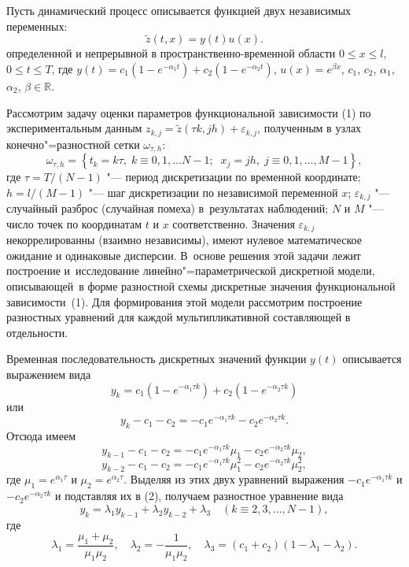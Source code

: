 Пусть динамический процесс описывается функцией двух независимых переменных:
\begin{equation}
\tilde z(t, x)=y(t)u(x).
\end{equation}
определенной и непрерывной в пространственно-временной области $0\leq{x}\leq{l}$, $0\leq{t}\leq{T}$, где $y(t)=c_1(1-e^{-\alpha_1t})+c_2(1-e^{-\alpha_2t})$, $u(x)=e^{\beta{x}}$, $c_1$, $c_2$, $\alpha_1$, $\alpha_2$, $\beta\in \mathbb{R}$.

Рассмотрим задачу оценки параметров функциональной зависимости (1) по экспериментальным данным $z_{k,j}=\tilde{z}({\tau}k, jh)+\varepsilon_{k,j}$, полученным в узлах конечно"=разностной сетки $\omega_{\tau,h}$:
$$\omega_{\tau,h}=\left\{t_k=k\tau,\; k\equiv 0, 1, \ldots N-1; \;\; x_j=jh, \; j\equiv 0, 1, \ldots, M-1\right\},
$$
где $\tau={T}/(N-1)$ "--- период дискретизации по временной координате; 
$h={l}/({M-1})$ "--- шаг дискретизации по независимой переменной $x$; 
$\varepsilon_{k,j}$ "--- случайный разброс (случайная помеха) в~результатах наблюдений; 
$N$ и $M$ "--- число точек по координатам $t$ и $x$ соответственно. 
Значения $\varepsilon_{k,j}$ некоррелированны (взаимно независимы), имеют нулевое математическое ожидание и одинаковые дисперсии. 
В~основе решения этой задачи лежит построение и~исследование линейно"=параметрической дискретной модели, описывающей~в форме разностной схемы дискретные значения функциональной зависимости~(1). 
Для формирования этой модели рассмотрим построение разностных уравнений для каждой мультипликативной составляющей в отдельности.

Временная последовательность дискретных значений функции $y(t)$ описывается выражением вида 
$$y_k=c_1(1-e^{-{\alpha_1}{\tau}k})+c_2(1-e^{-{\alpha_2}{\tau}k})$$ или
\begin{equation}
y_k-c_1-c_2=-c_1e^{-{\alpha_1}{\tau}k}-c_2e^{-{\alpha_2}{\tau}k}.
\end{equation}
Отсюда имеем $$y_{k-1}-c_1-c_2=-c_1e^{-\alpha_1\tau{k}}\mu_1-c_2e^{-\alpha_2\tau{k}}\mu_2,$$  $$y_{k-2}-c_1-c_2=-c_1e^{-\alpha_1\tau{k}}\mu_1^2-c_2e^{-\alpha_2\tau{k}}\mu_2^2,$$ где $\mu_1=e^{\alpha_1\tau}$ и $\mu_2=e^{\alpha_2\tau}$. Выделяя из этих двух уравнений выражения \mbox{$-c_1e^{-\alpha_1\tau{k}}$} и $-c_2e^{-\alpha_2\tau{k}}$ и подставляя их в (2), получаем разностное уравнение вида
\begin{equation}
y_k=\lambda_1y_{k-1}+\lambda_2y_{k-2}+\lambda_3 \quad (k\equiv 2, 3,\ldots,N-1),
\end{equation}
где 
\begin{equation}
\lambda_1=\frac{\mu_1+\mu_2}{\mu_1\mu_2}, \quad \lambda_2=-\frac{1}{\mu_1\mu_2}, \quad \lambda_3=(c_1+c_2)(1-\lambda_1-\lambda_2).
\end{equation}


